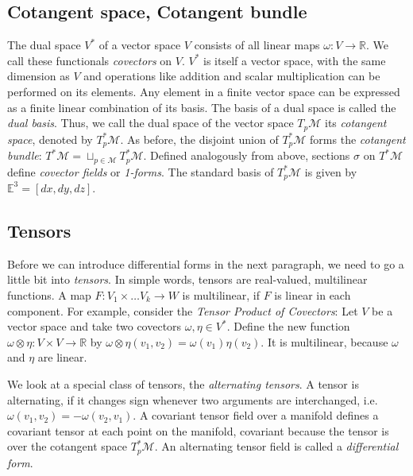 \documentclass[../thesis.tex]{subfiles}
\begin{document}
\subsection{Cotangent space, Cotangent bundle} The dual space $V^*$ of a vector space $V$
consists of all linear maps $\omega: V \to \mathbb{R}$. We call these functionals \emph{covectors} on $V$.
$V^*$ is itself a vector space, with the same dimension as $V$ and operations like addition and scalar multiplication
can be performed on its elements. Any element in a finite vector space can be expressed as 
a finite linear combination of its basis. The basis of a dual space is called the \emph{dual basis}.
Thus, we call the dual space of the vector space $T_p\mathcal{M}$ its \emph{cotangent space},
denoted by $T^*_p\mathcal{M}$. As before, the disjoint union of $T^*_p\mathcal{M}$ forms the \emph{cotangent bundle}:
$T^*\mathcal{M}=\sqcup _{p\in \mathcal{M}}T^*_p\mathcal{M}$. Defined analogously from above,
sections $\sigma$ on $T^*\mathcal{M}$ define \emph{covector fields} or \emph{1-forms}. The standard basis of $T_p^*\mathcal{M}$
is given by $\mathbb{E}^3=[dx,dy,dz]$.

\subsection{Tensors}
Before we can introduce differential forms in the next paragraph, we need to go a little bit into \emph{tensors}.
In simple words, tensors are real-valued, multilinear functions.
A map $F: V_1 \times \dots V_k \to W$ is multilinear, if $F$ is linear in each component.
For example, consider the \emph{Tensor Product of Covectors}:
Let $V$ be a vector space and take two covectors $\omega, \eta \in V^*$.
Define the new function $\omega \otimes \eta: V\times V \to \mathbb{R}$ by
$\omega \otimes \eta (v_1,v_2) = \omega(v_1)\eta(v_2)$. It is multilinear, because $\omega$ and $\eta$ are linear.

We look at a special class of tensors, the \emph{alternating tensors}.
A tensor is alternating, if it changes sign whenever two arguments are interchanged,
i.e. $\omega(v_1, v_2) = -\omega(v_2, v_1)$.
A covariant tensor field over a manifold defines a covariant tensor at each point on the manifold,
covariant because the tensor is over the cotangent space $T^*_p\mathcal{M}$.
An alternating tensor field is called a \emph{differential form}.
\end{document}
